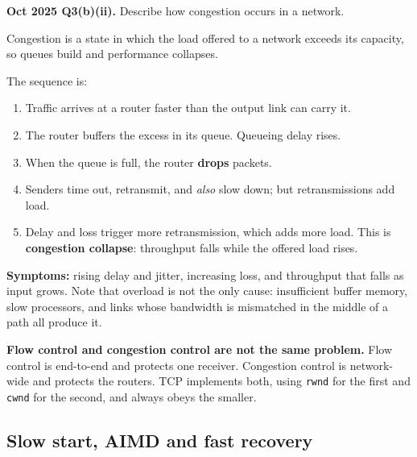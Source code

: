 \documentclass[11pt,a4paper]{article}
\begin{document}
\begin{pyqbox}
\textbf{Oct 2025 Q3(b)(ii).} Describe how congestion occurs in a network.
\end{pyqbox}

\begin{solbox}
Congestion is a state in which the load offered to a network exceeds its capacity, so queues build and performance collapses.

The sequence is:
\begin{enumerate}
\item Traffic arrives at a router faster than the output link can carry it.
\item The router buffers the excess in its queue. Queueing delay rises.
\item When the queue is full, the router \textbf{drops} packets.
\item Senders time out, retransmit, and \emph{also} slow down; but retransmissions add load.
\item Delay and loss trigger more retransmission, which adds more load. This is \textbf{congestion collapse}: throughput falls while the offered load rises.
\end{enumerate}

\textbf{Symptoms:} rising delay and jitter, increasing loss, and throughput that falls as input grows. Note that overload is not the only cause: insufficient buffer memory, slow processors, and links whose bandwidth is mismatched in the middle of a path all produce it.

\begin{dangerbox}
\textbf{Flow control and congestion control are not the same problem.} Flow control is end-to-end and protects one receiver. Congestion control is network-wide and protects the routers. TCP implements both, using \texttt{rwnd} for the first and \texttt{cwnd} for the second, and always obeys the smaller.
\end{dangerbox}
\end{solbox}

\subsection{Slow start, AIMD and fast recovery}
\end{document}
